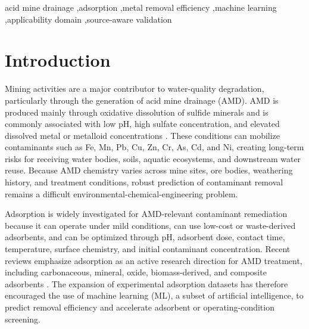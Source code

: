 \documentclass[review,12pt,number]{elsarticle}
\begin{document}
\begin{frontmatter}
\begin{abstract}
pH--$C_0$ regions requiring targeted future experiments. These results show that adsorption-ML accuracy can be heavily validation-dependent: high accuracy may indicate interpolation within familiar sources, whereas lower reference-held-out accuracy diagnoses the present gap in external-source transfer.
\end{abstract}

\begin{keyword}
acid mine drainage \sep adsorption \sep metal removal efficiency \sep machine learning \sep applicability domain \sep source-aware validation
\end{keyword}

\end{frontmatter}

\linenumbers

\section{Introduction}

Mining activities are a major contributor to water-quality degradation, particularly through the generation of acid mine drainage (AMD). AMD is produced mainly through oxidative dissolution of sulfide minerals and is commonly associated with low pH, high sulfate concentration, and elevated dissolved metal or metalloid concentrations \cite{simate2014}. These conditions can mobilize contaminants such as Fe, Mn, Pb, Cu, Zn, Cr, As, Cd, and Ni, creating long-term risks for receiving water bodies, soils, aquatic ecosystems, and downstream water reuse. Because AMD chemistry varies across mine sites, ore bodies, weathering history, and treatment conditions, robust prediction of contaminant removal remains a difficult environmental-chemical-engineering problem.

Adsorption is widely investigated for AMD-relevant contaminant remediation because it can operate under mild conditions, can use low-cost or waste-derived adsorbents, and can be optimized through pH, adsorbent dose, contact time, temperature, surface chemistry, and initial contaminant concentration. Recent reviews emphasize adsorption as an active research direction for AMD treatment, including carbonaceous, mineral, oxide, biomass-derived, and composite adsorbents \cite{dube2024}. The expansion of experimental adsorption datasets has therefore encouraged the use of machine learning (ML), a subset of artificial intelligence, to predict removal efficiency and accelerate adsorbent or operating-condition screening.
\end{document}
